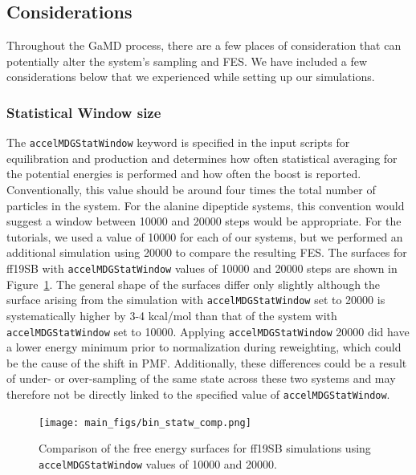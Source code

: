 \documentclass[9pt,tutorial,pubversion]{livecoms}
\begin{document}
\subsection{Considerations}
Throughout the GaMD process, there are a few places of consideration that can potentially alter the system's sampling and FES. We have included a few considerations below that we experienced while setting up our simulations.

\subsubsection{Statistical Window size} 
The \texttt{accelMDGStatWindow} keyword is specified in the input scripts for equilibration and production and determines how often statistical averaging for the potential energies is performed and how often the boost is reported. Conventionally, this value should be around four times the total number of particles in the system. For the alanine dipeptide systems, this convention would suggest a window between 10000 and 20000 steps would be appropriate. For the tutorials, we used a value of 10000 for each of our systems, but we performed an additional simulation using 20000 to compare the resulting FES. The surfaces for ff19SB with \texttt{accelMDGStatWindow} values of 10000 and 20000 steps are shown in Figure~\ref{fig:binstatw}. The general shape of the surfaces differ only slightly although the surface arising from the simulation with \texttt{accelMDGStatWindow} set to 20000 is systematically higher by 3-4 kcal/mol than that of  the system with \texttt{accelMDGStatWindow} set to 10000. Applying \texttt{accelMDGStatWindow} 20000 did have a lower energy minimum prior to normalization during reweighting, which could be the cause of the shift in PMF. Additionally, these differences could be a result of under- or over-sampling of the same state across these two systems and may therefore not be directly linked to the specified value of \texttt{accelMDGStatWindow}. 

\begin{figure}[h]
    \texttt{[image: main\_figs/bin\_statw\_comp.png]}
    \caption{Comparison of the free energy surfaces for ff19SB simulations using \texttt{accelMDGStatWindow} values of 10000 and 20000.}
    \label{fig:binstatw}
\end{figure}
\end{document}
